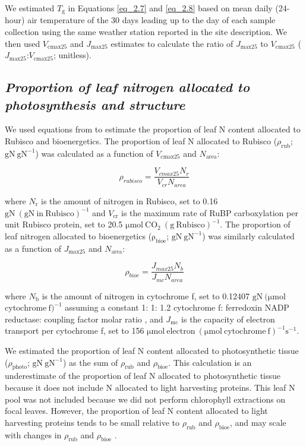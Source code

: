     \noindent We estimated $T_\mathrm{g}$ in Equations \ref{eq_2.7} and \ref{eq_2.8} based on mean daily (24-hour) air temperature of the 30 days leading up to the day of each sample collection using the same weather station reported in the site description. We then used $V_{\mathrm{cmax25}}$ and $J_{\mathrm{max25}}$ estimates to calculate the ratio of $J_{\mathrm{max25}}$ to $V_{\mathrm{cmax25}}$ ($J_{\mathrm{max25}}$:$V_{\mathrm{cmax25}}$; unitless).

    \subsection{\textit{Proportion of leaf nitrogen allocated to photosynthesis and structure}}

    We used equations from  to estimate the proportion of leaf N content allocated to Rubisco and bioenergetics. The proportion of leaf N allocated to Rubisco ($\rho_\mathrm{{rub}}$; $\mathrm{gN\ gN^{-1}}$) was calculated as a function of $V_\mathrm{cmax25}$ and $N_\mathrm{area}$: 

    \begin{equation} \label{eqn_2.9}
        \rho_{rubisco}=\frac{V_{cmax25}N_r}{V_{cr}N_{area}}
    \end{equation}

    \noindent where $N_\mathrm{r}$ is the amount of nitrogen in Rubisco, set to 0.16 $\mathrm{gN\ (gN\ in\ Rubisco)^{-1}}$ and $V_\mathrm{cr}$ is the maximum rate of RuBP carboxylation per unit Rubisco protein, set to 20.5 $\mathrm{\mu mol\ CO_2\ (g\ Rubisco)^{-1}}$. The proportion of leaf nitrogen allocated to bioenergetics ($\mathrm{\rho_{bioe}}$; $\mathrm{gN\ gN^{-1}}$) was similarly calculated as a function of $J_\mathrm{max25}$ and $N_\mathrm{area}$:

    \begin{equation} \label{eqn_2.10}
        \rho_{bioe}=\frac{J_{max25}N_b}{J_{mc}N_{area}}
    \end{equation}

    where $N_\mathrm{b}$ is the amount of nitrogen in cytochrome f, set to 0.12407 $\mathrm{gN\ (\mu mol}$ $\mathrm{cytochrome\ f)^{-1}}$ assuming a constant 1: 1: 1.2 cytochrome f: ferredoxin NADP reductase: coupling factor molar ratio , and $J_\mathrm{mc}$ is the capacity of electron transport per cytochrome f, set to 156 $\mathrm{\mu mol\ electron\ (\mu mol\ cytochrome\ f)^{-1} s^{-1}}$.

    We estimated the proportion of leaf N content allocated to photosynthetic tissue ($\rho_\mathrm{{photo}}$; $\mathrm{gN\ gN^{-1}}$) as the sum of $\rho_\mathrm{{rub}}$ and $\rho_\mathrm{{bioe}}$. This calculation is an underestimate of the proportion of leaf N allocated to photosynthetic tissue because it does not include N allocated to light harvesting proteins. This leaf N pool was not included because we did not perform chlorophyll extractions on focal leaves. However, the proportion of leaf N content allocated to light harvesting proteins tends to be small relative to $\rho_\mathrm{{rub}}$ and $\rho_\mathrm{{bioe}}$, and may scale with changes in $\rho_\mathrm{{rub}}$ and $\rho_\mathrm{{bioe}}$ .


